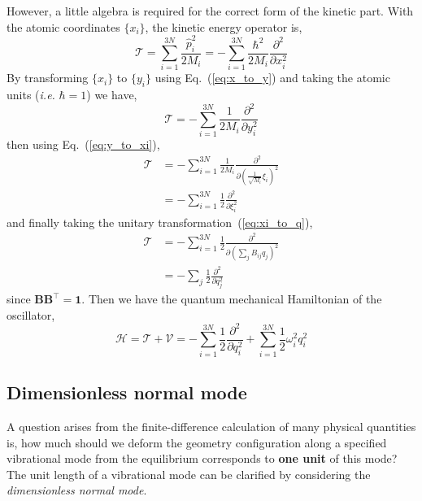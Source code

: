 \documentclass[a4paper,notitlepage,preprint]{revtex4-1}
\newcommand\mbf{\mathbf}
\newcommand\mcr{\mathscr}
\begin{document}
However, a little algebra is required for the correct form of the kinetic part. With the atomic coordinates $\{x_i\}$, the kinetic energy operator is,
\begin{equation}
	\mcr{T} = \sum_{i=1}^{3N} \frac{\hat{p}_i^2}{2M_i} = -\sum_{i=1}^{3N} \frac{\hbar^2}{2M_i}\frac{\partial^2}{\partial x_i^2}
	\label{eq:T_q_x}
\end{equation}
\noindent By transforming $\{x_i\}$ to $\{y_i\}$ using Eq.~(\ref{eq:x_to_y}) and taking the atomic units ({\it i.e.} $\hbar = 1$) we have,
\begin{equation}
	\mcr{T} = -\sum_{i=1}^{3N}\frac{1}{2M_i}\frac{\partial^2}{\partial y_i^2}
	\label{eq:T_q_y}
\end{equation}
\noindent then using Eq.~(\ref{eq:y_to_xi}),
\begin{equation}
	\begin{split}
		\mcr{T} &= -\sum_{i=1}^{3N} \frac{1}{2M_i} \frac{\partial^2}{\partial (\frac{1}{\sqrt{M_i}}\xi_i)^2} \\
		&= -\sum_{i=1}^{3N}\frac{1}{2}\frac{\partial^2}{\partial\xi_i^2}
	\end{split}
	\label{eq:T_q_xi}
\end{equation}
\noindent and finally taking the unitary transformation~(\ref{eq:xi_to_q}),
\begin{equation}
	\begin{split}
		\mcr{T} &= -\sum_{i=1}^{3N}\frac{1}{2} \frac{\partial^2}{\partial (\sum_j B_{ij}q_j)^2} \\
		&= -\sum_j \frac{1}{2}\frac{\partial^2}{\partial q_j^2}
	\end{split}
	\label{eq:T_q_q}
\end{equation}
\noindent since $\mbf{B}\mbf{B}^\top = \mbf{1}$. Then we have the quantum mechanical Hamiltonian of the oscillator,
\begin{equation}
	\mcr{H} = \mcr{T} + \mcr{V} = -\sum_{i=1}^{3N}\frac{1}{2}\frac{\partial^2}{\partial q_i^2} + \sum_{i=1}^{3N} \frac{1}{2}\omega_i^2 q_i^2
	\label{eq:Hq}
\end{equation}

\subsection{Dimensionless normal mode}
A question arises from the finite-difference calculation of many physical quantities is, how much should we deform the geometry configuration along a specified vibrational mode from the equilibrium corresponds to {\bf one unit} of this mode? The unit length of a vibrational mode can be clarified by considering the {\em dimensionless normal mode}.
\end{document}
